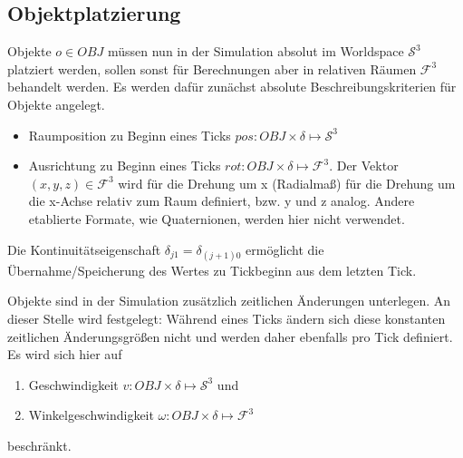\subsection{Objektplatzierung}
\label{sec:objects_sim}

Objekte $o\in OBJ$ müssen nun in der Simulation absolut im Worldspace $\mathcal{S}^3$ platziert werden, sollen sonst für Berechnungen aber in relativen Räumen $\mathcal{F}^3$ behandelt werden. Es werden dafür zunächst absolute Beschreibungskriterien für Objekte angelegt.
\begin{itemize}
\item Raumposition zu Beginn eines Ticks $pos : OBJ \times \delta \mapsto \mathcal{S}^3$
\item Ausrichtung zu Beginn eines Ticks $rot : OBJ \times \delta \mapsto \mathcal{F}^3$. Der Vektor $(x, y, z) \in\mathcal{F}^3$ wird für die Drehung um x (Radialmaß) für die Drehung um die x-Achse relativ zum Raum definiert, bzw. y und z analog. Andere etablierte Formate, wie Quaternionen, werden hier nicht verwendet.
\end{itemize}
Die Kontinuitätseigenschaft $\delta_{j1} = \delta_{(j+1)0}$ ermöglicht die Übernahme/Speicherung des Wertes zu Tickbeginn aus dem letzten Tick.

Objekte sind in der Simulation zusätzlich zeitlichen Änderungen unterlegen.
An dieser Stelle wird festgelegt: Während eines Ticks ändern sich diese konstanten zeitlichen Änderungsgrößen nicht und werden daher ebenfalls pro Tick definiert.\\
 Es wird sich hier auf
\begin{enumerate}
\item Geschwindigkeit $v: OBJ \times \delta \mapsto \mathcal{S}^3$  und
\item Winkelgeschwindigkeit $\omega : OBJ \times \delta \mapsto \mathcal{F}^3 $
\end{enumerate}
beschränkt.

